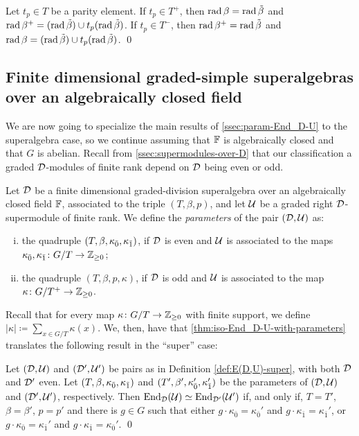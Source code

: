 \begin{cor}\label{cor:radical-with-parity}
    Let $t_p\in T$ be a parity element. 
    If $t_p\in T^+$, then $\operatorname{rad} \beta = \operatorname{rad} \tilde\beta$ and $\operatorname{rad} \beta^+ = (\operatorname{rad} \tilde\beta) \cup  t_p(\operatorname{rad} \tilde\beta)$. 
    If $t_p\in T^-$, then $\operatorname{rad} \beta^+ = \operatorname{rad} \tilde\beta$ and $\operatorname{rad} \beta = (\operatorname{rad} \tilde\beta) \cup  t_p(\operatorname{rad} \tilde\beta)$. \qed
\end{cor}



\subsection{Finite dimensional graded-simple superalgebras over an algebraically closed field}\label{ssec:classification-assc-super}

We are now going to specialize the main results of \cref{ssec:param-End_D-U} to the superalgebra case, so we continue assuming that $\mathbb{F}$ is algebraically closed and that $G$ is abelian. 
Recall from \cref{ssec:supermodules-over-D} that our classification a graded $\mathcal{D}$-modules of finite rank depend on $\mathcal{D}$ being even or odd.

\begin{defi}\label{def:E(D,U)-super}
    Let $\mathcal{D}$ be a finite dimensional graded-division superalgebra over an algebraically closed field $\mathbb{F}$, associated to the triple $(T, \beta, p)$, and let $\mathcal U$ be a graded right $\mathcal{D}$-supermodule of finite rank. 
    We define the \emph{parameters} of the pair $(\mathcal{D}, \mathcal U)$ as:
    \begin{enumerate}[(i)]
        \item the quadruple $(T, \beta, \kappa_{\bar{0}}, \kappa_{\bar{1}})$, if $\mathcal{D}$ is even and $\mathcal U$ is associated to the maps $\kappa_{\bar{0}}, \kappa_{\bar{1}} \colon G/T \to \mathbb{Z}_{\geq 0}$;
        \item the quadruple $(T, \beta, p, \kappa)$, if $\mathcal{D}$ is odd and $\mathcal U$ is associated to the map $\kappa\colon G/T^+ \to \mathbb{Z}_{\geq 0}$.
    \end{enumerate}
\end{defi}

Recall that for every map $\kappa\colon G/T\to \mathbb{Z}_{\geq 0}$ with finite support, we define $|\kappa| \coloneqq \sum_{x \in G/T} \kappa(x)$. 
We, then, have that  \cref{thm:iso-End_D-U-with-parameters} translates the following result in the ``super'' case:

\begin{thm}\label{thm:iso-D-even}
	Let $(\mathcal{D}, \mathcal U)$ and $(\mathcal{D}', \mathcal U')$ be pairs as in Definition \ref{def:E(D,U)-super}, with both $\mathcal{D}$ and $\mathcal{D}'$ even. 
	Let $(T, \beta, \kappa_{\bar{0}}, \kappa_{\bar{1}})$ and $(T', \beta', \kappa_{\bar{0}}', \kappa_{\bar{1}}')$ be the parameters of $(\mathcal{D}, \mathcal U)$ and $(\mathcal{D}', \mathcal U')$, respectively. 
	Then $\operatorname{End}_{\mathcal{D}} (\mathcal U) \simeq \operatorname{End}_{\mathcal{D}'} (\mathcal U')$ if, and only if, $T=T'$, $\beta=\beta'$, $p = p'$ and there is $g\in G$ such that either $g \cdot \kappa_{\bar 0}=\kappa_{\bar 0}'$ and $g \cdot \kappa_{\bar 1}=\kappa_{\bar 1}'$, or $g \cdot \kappa_{\bar 0}=\kappa_{\bar 1}'$ and $g \cdot \kappa_{\bar 1}=\kappa_{\bar 0}'$. \qed
\end{thm}

